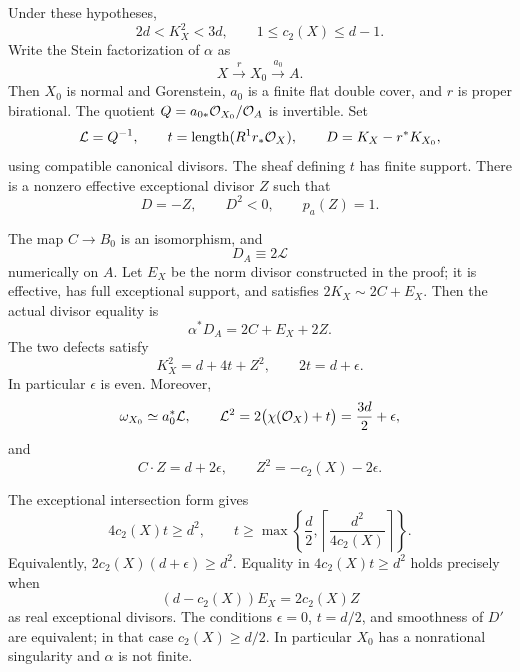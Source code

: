 \begin{theorem}
\label{thm:smallest-endpoint-strict-canonical}
Under these hypotheses,
\begin{equation}\label{eq:strict-canonical-interval}
 2d<K_X^2<3d,\qquad 1\le c_2(X)\le d-1.
\end{equation}
Write the Stein factorization of $\alpha$ as
\[
 X\xrightarrow{\,r\,}X_0\xrightarrow{\,a_0\,}A.
\]
Then $X_0$ is normal and Gorenstein, $a_0$ is a finite flat
double cover, and $r$ is proper birational.
The quotient $Q=a_{0*}\mathcal O_{X_0}/\mathcal O_A$ is invertible.
Set
\[
 \mathcal L=Q^{-1},\qquad
 t=\operatorname{length}(R^1r_*\mathcal O_X),\qquad
 D=K_X-r^*K_{X_0},
\]
using compatible canonical divisors.
The sheaf defining $t$ has finite support.
There is a nonzero effective exceptional divisor $Z$ such that
\begin{equation}\label{eq:strict-canonical-discrepancy}
 D=-Z,\qquad D^2<0,\qquad p_a(Z)=1.
\end{equation}

The map $C\to B_0$ is an isomorphism, and
\begin{equation}\label{eq:strict-canonical-image-class}
 D_A\equiv2\mathcal L
\end{equation}
numerically on $A$.
Let $E_X$ be the norm divisor constructed in the proof; it is
effective, has full exceptional support, and satisfies
$2K_X\sim2C+E_X$.
Then the actual divisor equality is
\begin{equation}\label{eq:strict-canonical-image-pullback}
 \alpha^*D_A=2C+E_X+2Z.
\end{equation}
The two defects satisfy
\begin{equation}\label{eq:strict-canonical-stein-defect}
 K_X^2=d+4t+Z^2,\qquad 2t=d+\epsilon.
\end{equation}
In particular $\epsilon$ is even.
Moreover,
\begin{equation}\label{eq:strict-canonical-double-cover-line}
 \omega_{X_0}\simeq a_0^*\mathcal L,\qquad
 \mathcal L^2=2\bigl(\chi(\mathcal O_X)+t\bigr)
             =\frac{3d}{2}+\epsilon,
\end{equation}
and
\begin{equation}\label{eq:strict-canonical-image-cycle}
 C\cdot Z=d+2\epsilon,\qquad
 Z^2=-c_2(X)-2\epsilon.
\end{equation}

The exceptional intersection form gives
\begin{equation}\label{eq:strict-canonical-defect-tradeoff}
 4c_2(X)t\ge d^2,\qquad
 t\ge\max\left\{\frac d2,
          \left\lceil\frac{d^2}{4c_2(X)}\right\rceil\right\}.
\end{equation}
Equivalently, $2c_2(X)(d+\epsilon)\ge d^2$.
Equality in $4c_2(X)t\ge d^2$ holds precisely when
\begin{equation}\label{eq:strict-canonical-tradeoff-equality}
 (d-c_2(X))E_X=2c_2(X)Z
\end{equation}
as real exceptional divisors.
The conditions $\epsilon=0$, $t=d/2$, and smoothness of $D'$
are equivalent; in that case $c_2(X)\ge d/2$.
In particular $X_0$ has a nonrational singularity and $\alpha$
is not finite.
\end{theorem}

